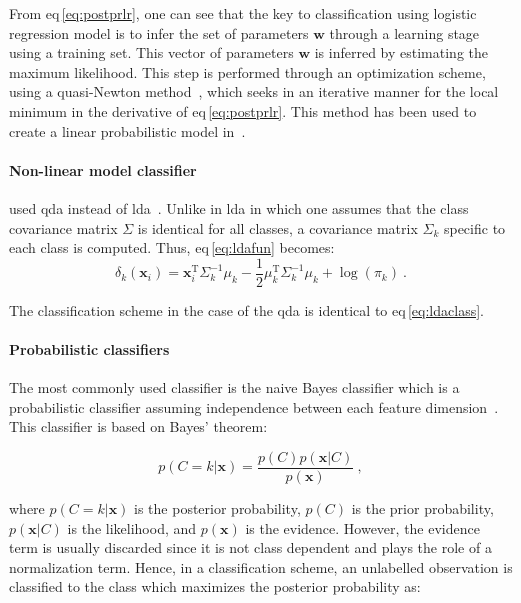 From \acs{eq}\,\eqref{eq:postprlr}, one can see that the key to classification using logistic regression model is to infer the set of parameters $\mathbf{w}$ through a learning stage using a training set.
This vector of parameters $\mathbf{w}$ is inferred by estimating the maximum likelihood.
This step is performed through an optimization scheme, using a quasi-Newton method~\cite{Byrd1995}, which seeks in an iterative manner for the local minimum in the derivative of \acs{eq}\,\eqref{eq:postprlr}.
This method has been used to create a linear probabilistic model in~\cite{Kelm2007,Puech2009,lehaire2014computer,rampun2015computer}.

\paragraph{Non-linear model classifier}
\citeauthor{Viswanath2012} used \acf{qda} instead of \ac{lda}~\cite{Viswanath2012}.
Unlike in \ac{lda} in which one assumes that the class covariance matrix $\Sigma$ is identical for all classes, a covariance matrix $\Sigma_k$ specific to each class is computed.
Thus, \acs{eq}\,\eqref{eq:ldafun} becomes:
\begin{equation}
	\delta_{k}(\mathbf{x}_i) = \mathbf{x}_i^{\text{T}} \Sigma_{k}^{-1} \mu_k - \frac{1}{2} \mu_{k}^{\text{T}} \Sigma_{k}^{-1} \mu_k + \log (\pi_k) \ .
	\label{eq:qdafun}
\end{equation}

The classification scheme in the case of the \ac{qda} is identical to \acs{eq}\,\eqref{eq:ldaclass}.

\paragraph{Probabilistic classifiers}
The most commonly used classifier is the naive Bayes classifier which is a probabilistic classifier assuming independence between each feature dimension~\cite{Rish2001}.
This classifier is based on Bayes' theorem:

\begin{equation}
	p(C=k|\mathbf{x}) = \frac{p(C)p(\mathbf{x}|C)}{p(\mathbf{x})} \ ,
	\label{eq:bayth}
\end{equation}

\noindent where $p(C=k|\mathbf{x})$ is the posterior probability, $p(C)$ is the prior probability, $p(\mathbf{x}|C)$ is the likelihood, and $p(\mathbf{x})$ is the evidence. 
However, the evidence term is usually discarded since it is not class dependent and plays the role of a normalization term.
Hence, in a classification scheme, an unlabelled observation is classified to the class which maximizes the posterior probability as:

